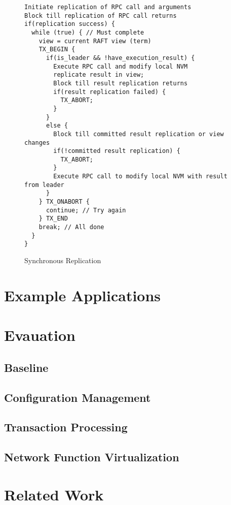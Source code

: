 \documentclass[twocolumn]{article}
\begin{document}
\begin{figure*}
\centering
\begin{minipage}{0.7\textwidth}  
{ \scriptsize
\begin{verbatim}
Initiate replication of RPC call and arguments
Block till replication of RPC call returns
if(replication success) {  
  while (true) { // Must complete 
    view = current RAFT view (term)
    TX_BEGIN {
      if(is_leader && !have_execution_result) {
        Execute RPC call and modify local NVM
        replicate result in view;
        Block till result replication returns
        if(result replication failed) {
          TX_ABORT;
        }
      }
      else {
        Block till committed result replication or view changes
        if(!committed result replication) {
          TX_ABORT;
        }
        Execute RPC call to modify local NVM with result from leader
      }
    } TX_ONABORT {
      continue; // Try again
    } TX_END
    break; // All done
  }
}
\end{verbatim}
}
\end{minipage}
\caption{Synchronous Replication}
\label{fig:sync_rep}
\end{figure*}


\section{Example Applications}
\label{sec:examples}

\section{Evauation}

\subsection{Baseline}

\subsection{Configuration Management}

\subsection{Transaction Processing}

\subsection{Network Function Virtualization}

\section{Related Work}
\end{document}
